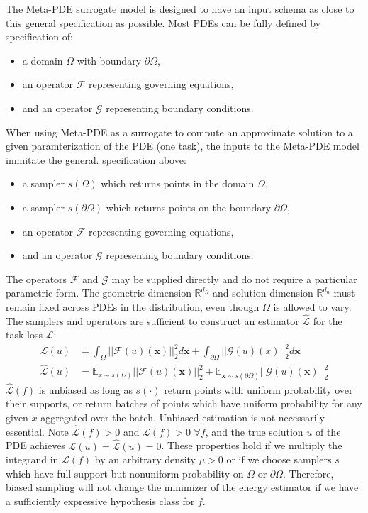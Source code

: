 The Meta-PDE surrogate model is designed to have an input schema as close to this general specification as possible. Most PDEs can be fully defined by specification of:
\begin{itemize}
  \item a domain $\Omega$ with boundary $\partial \Omega$,
  \item an operator $\mathcal{F}$ representing governing equations,
  \item and an operator $\mathcal{G}$ representing boundary conditions.
\end{itemize}
When using Meta-PDE as a surrogate to compute an approximate solution to a given paramterization of the PDE (one task), the inputs to the Meta-PDE model immitate the general. specification above:
\begin{itemize}
  \item a sampler $s(\Omega)$ which returns points in the domain $\Omega$,
  \item a sampler $s(\partial\Omega)$ which returns points on the boundary $\partial\Omega$,
  \item an operator $\mathcal{F}$ representing governing equations,
  \item and an operator $\mathcal{G}$ representing boundary conditions.
\end{itemize}
The operators $\mathcal{F}$ and $\mathcal{G}$ may be supplied directly and do not require a particular parametric form. The geometric dimension $\mathbb{R}^{d_\Omega}$ and solution dimension $\mathbb{R}^{d_u}$ must remain fixed across PDEs in the distribution, even though $\Omega$ is allowed to vary. The samplers and operators are sufficient to construct an estimator $\hat{\mathcal{L}}$ for the task loss $\mathcal{L}$:
\begin{align}
  \mathcal{L}(u) &= \int_{\Omega} \big|\big|\mathcal{F}(u)(\bm{x})\big|\big|^2_2 d\bm{x} +
  \int_{\partial\Omega} \big|\big|\mathcal{G}(u)(x)\big|\big|_2^2 d\bm{x} \\
  \hat{\mathcal{L}}(u) &= \mathbb{E}_{x \sim s(\Omega)} \big|\big|\mathcal{F}(u)(\bm{x})\big|\big|^2_2 +
  \mathbb{E}_{\bm{x} \sim s(\partial \Omega)} \big|\big|\mathcal{G}(u)(\bm{x})\big|\big|_2^2
\end{align}
$\hat{\mathcal{L}}(f)$ is unbiased as long as $s(\cdot)$ return points with uniform probability over their supports, or return batches of points which have uniform probability for any given $x$ aggregated over the batch. Unbiased estimation is not necessarily essential. Note $\hat{\mathcal{L}}(f) > 0$ and $\mathcal{L}(f) > 0$ $\forall f$, and the true solution $u$ of the PDE achieves $\mathcal{L}(u) = \hat{\mathcal{L}}(u) = 0$. These properties hold if we multiply the integrand in $\mathcal{L}(f)$ by an arbitrary density $\mu > 0$ or if we choose samplers $s$ which have full support but nonuniform probability on $\Omega$ or $\partial \Omega$. Therefore, biased sampling will not change the minimizer of the energy estimator if we have a sufficiently expressive hypothesis class for $f$.

